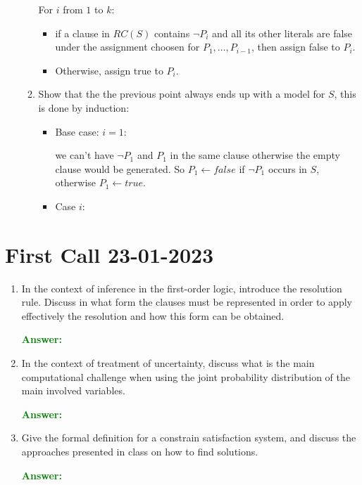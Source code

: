 \documentclass[12pt]{article}
\begin{document}
\begin{enumerate}[label=\textbf{PL.\arabic*}]
\begin{enumerate}
        For $i$ from $1$ to $k$:
        \begin{itemize}
            \item if a clause in $RC(S)$ contains $\lnot P_i$ and all its other literals are false under the assignment choosen for $P_1,\ldots,P_{i-1}$, 
            then assign false to $P_i$.
            \item Otherwise, assign true to $P_i$.       
        \end{itemize}
        \item Show that the the previous point always ends up with a model for $S$, this is done by induction:
        \begin{itemize}
            \item Base case: $i = 1$:
            
            we can't have $\lnot P_1$ and $P_1$ in the same clause otherwise the empty clause would be generated.
            So $P_1 \leftarrow false$ if $\lnot P_1$ occurs in $S$, otherwise $P_1 \leftarrow true$.
            \item Case $i$:
            
        \end{itemize}
    \end{enumerate}


\end{enumerate}

\section{First Call 23-01-2023}
\begin{enumerate}[label=\textbf{A.\arabic*}]



    \item In the context of inference in the first-order logic, introduce the resolution rule. 
    Discuss in what form the clauses must be represented in order to apply effectively the resolution and how this form can be obtained.\label{l}

    \textcolor{green}{\textbf{Answer:}}
    
    \item In the context of treatment of uncertainty, discuss what is the main computational challenge when using the joint probability distribution of the main involved variables.
    
    \textcolor{green}{\textbf{Answer:}}

    \item Give the formal definition for a constrain satisfaction system, and discuss the approaches presented in class on how to find solutions.
    
    \textcolor{green}{\textbf{Answer:}}

\end{enumerate}
\end{document}
